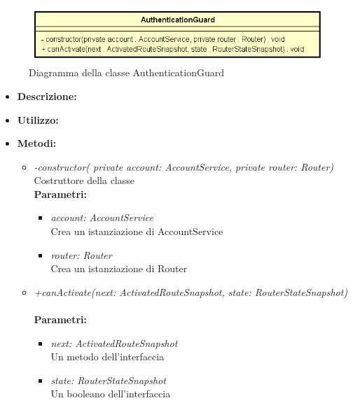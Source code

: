 \begin{figure}[h!]
	\centering
	\includegraphics[scale=0.8]{res/sections/SpecificaFrontEnd/Services/Disegnetti/authenticationguard.png}
	\caption{Diagramma della classe AuthenticationGuard}
\end{figure}

\begin{itemize}
	\item \textbf{Descrizione:}\\
	
	\item \textbf{Utilizzo:}\\
	
	\item \textbf{Metodi:}
		\begin{itemize}
			\item \emph{-constructor( private account: AccountService, private router: Router)}\\
    		Costruttore della classe\\
    		\textbf{Parametri:}
    		\begin{itemize}
    			\item \emph{account: AccountService}\\
    			Crea un istanziazione di AccountService
    			\item \emph{router: Router}\\
    			Crea un istanziazione di Router
    		\end{itemize}
    		\item \emph{+canActivate(next: ActivatedRouteSnapshot, state: RouterStateSnapshot)}\\
    		\\
    		\textbf{Parametri:}
    		\begin{itemize}
    			\item \emph{next: ActivatedRouteSnapshot}\\
    			Un metodo dell'interfaccia
    			\item \emph{state: RouterStateSnapshot}\\
    			Un booleano dell'interfaccia
    		\end{itemize}
		\end{itemize}
\end{itemize}